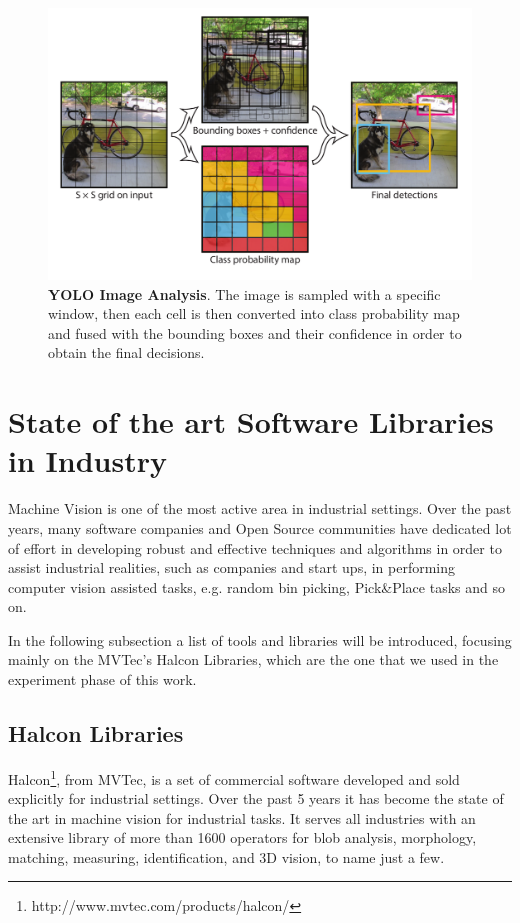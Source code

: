 \begin{figure}
    \centering
    \includegraphics[width=\textwidth]{figures/1_perception_and_sensing_in_robotics/yolo_detail}
    \caption{\textbf{YOLO Image Analysis}. The image is sampled with a specific window, then each cell is then converted into class probability map and fused with the bounding boxes and their confidence in order to obtain the final decisions.} 
    \label{fig:yolo_detail}
\end{figure}

\section{State of the art Software Libraries in Industry}\label{sec:industrylibraries}
Machine Vision is one of the most active area in industrial settings. Over the past years, many software companies and Open Source communities have dedicated lot of effort in developing robust and effective techniques and algorithms in order to assist industrial realities, such as companies and start ups, in performing computer vision assisted tasks, e.g. random bin picking, Pick\&Place tasks and so on.

In the following subsection a list of tools and libraries will be introduced, focusing mainly on the MVTec's Halcon Libraries, which are the one that we used in the experiment phase of this work. 

\subsection{Halcon Libraries}\label{subsec:halconlibs}
Halcon\footnote{http://www.mvtec.com/products/halcon/}, from MVTec, is a set of commercial software developed and sold explicitly for industrial settings. Over the past 5 years it has become the state of the art in machine vision for industrial tasks. It serves all industries with an extensive library of more than 1600 operators for blob analysis, morphology, matching, measuring, identification, and 3D vision, to name just a few.

